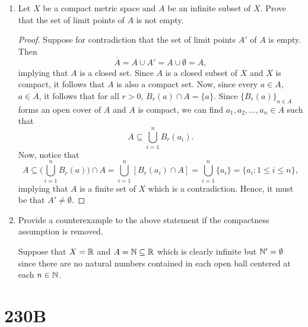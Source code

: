 \documentclass[a4paper]{article}
\begin{document}
\begin{problem}
  \begin{enumerate}
      \item[(a)] Let \( X  \) be a compact metric space and \( A  \) be an infinite subset of \( X  \). Prove that the set of limit points of \( A  \) is not empty.
          \begin{proof}
          Suppose for contradiction that the set of limit points \( A' \) of \( A  \) is empty. Then   
          \[  \overline{A} = A \cup A' = A \cup \emptyset = A,  \]
          implying that \( A  \) is a closed set. Since \( A  \) is a closed subset of \( X  \) and \( X  \) is compact, it follows that \( A  \) is also a compact set. Now, since every \( a \in A  \), \( a \in \overline{A} \), it follows that for all \( r > 0  \), \( {B}_{r}(a) \cap A = \{ a  \}  \). Since \( \{ {B}_{r}(a) \}_{a \in A }  \) forms an open cover of \( A  \) and \( A  \) is compact, we can find \( {a}_{1}, {a}_{2}, \dots, {a}_{n} \in A  \) such that 
          \[  A \subseteq \bigcup_{ i = 1  }^{ n }  {B}_{r}({a}_{i}). \]
          Now, notice that 
          \[  A \subseteq \Big(\bigcup_{ i=1  }^{ n }  {B}_{r}(a) \Big) \cap A = \bigcup_{ i = 1  }^{ n }  [{B}_{r}({a}_{i}) \cap A ] = \bigcup_{ i=1  }^{ n }  \{ {a}_{i} \}  = \{ {a}_{i} : 1 \leq i \leq n \},   \]
          implying that \( A  \) is a finite set of \( X  \) which is a contradiction. Hence, it must be that \( A' \neq \emptyset \).

          \end{proof}
      \item[(b)] Provide a counterexample to the above statement if the compactness assumption is removed.
          \begin{solution}
          Suppose that \( X  = \mathbb{R}  \) and \( A = \mathbb{N} \subseteq \mathbb{R}   \) which is clearly infinite but \( \mathbb{N}' = \emptyset \) since there are no natural numbers contained in each open ball centered at each \( n \in \mathbb{N} \). 
          \end{solution}
  \end{enumerate}  
\end{problem}

\section{230B}
\end{document}
